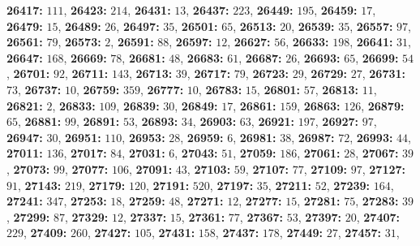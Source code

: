 \textsf{\bfseries 26417:} $111$, \textsf{\bfseries 26423:} $214$, \textsf{\bfseries 26431:} $13$, \textsf{\bfseries 26437:} $223$, \textsf{\bfseries 26449:} $195$, \textsf{\bfseries 26459:} $17$, \textsf{\bfseries 26479:} $15$, \textsf{\bfseries 26489:} $26$, \textsf{\bfseries 26497:} $35$, \textsf{\bfseries 26501:} $65$, \textsf{\bfseries 26513:} $20$, \textsf{\bfseries 26539:} $35$, \textsf{\bfseries 26557:} $97$, \textsf{\bfseries 26561:} $79$, \textsf{\bfseries 26573:} $2$, \textsf{\bfseries 26591:} $88$, \textsf{\bfseries 26597:} $12$, \textsf{\bfseries 26627:} $56$, \textsf{\bfseries 26633:} $198$, \textsf{\bfseries 26641:} $31$, \textsf{\bfseries 26647:} $168$, \textsf{\bfseries 26669:} $78$, \textsf{\bfseries 26681:} $48$, \textsf{\bfseries 26683:} $61$, \textsf{\bfseries 26687:} $26$, \textsf{\bfseries 26693:} $65$, \textsf{\bfseries 26699:} $54$, \textsf{\bfseries 26701:} $92$, \textsf{\bfseries 26711:} $143$, \textsf{\bfseries 26713:} $39$, \textsf{\bfseries 26717:} $79$, \textsf{\bfseries 26723:} $29$, \textsf{\bfseries 26729:} $27$, \textsf{\bfseries 26731:} $73$, \textsf{\bfseries 26737:} $10$, \textsf{\bfseries 26759:} $359$, \textsf{\bfseries 26777:} $10$, \textsf{\bfseries 26783:} $15$, \textsf{\bfseries 26801:} $57$, \textsf{\bfseries 26813:} $11$, \textsf{\bfseries 26821:} $2$, \textsf{\bfseries 26833:} $109$, \textsf{\bfseries 26839:} $30$, \textsf{\bfseries 26849:} $17$, \textsf{\bfseries 26861:} $159$, \textsf{\bfseries 26863:} $126$, \textsf{\bfseries 26879:} $65$, \textsf{\bfseries 26881:} $99$, \textsf{\bfseries 26891:} $53$, \textsf{\bfseries 26893:} $34$, \textsf{\bfseries 26903:} $63$, \textsf{\bfseries 26921:} $197$, \textsf{\bfseries 26927:} $97$, \textsf{\bfseries 26947:} $30$, \textsf{\bfseries 26951:} $110$, \textsf{\bfseries 26953:} $28$, \textsf{\bfseries 26959:} $6$, \textsf{\bfseries 26981:} $38$, \textsf{\bfseries 26987:} $72$, \textsf{\bfseries 26993:} $44$, \textsf{\bfseries 27011:} $136$, \textsf{\bfseries 27017:} $84$, \textsf{\bfseries 27031:} $6$, \textsf{\bfseries 27043:} $51$, \textsf{\bfseries 27059:} $186$, \textsf{\bfseries 27061:} $28$, \textsf{\bfseries 27067:} $39$, \textsf{\bfseries 27073:} $99$, \textsf{\bfseries 27077:} $106$, \textsf{\bfseries 27091:} $43$, \textsf{\bfseries 27103:} $59$, \textsf{\bfseries 27107:} $77$, \textsf{\bfseries 27109:} $97$, \textsf{\bfseries 27127:} $91$, \textsf{\bfseries 27143:} $219$, \textsf{\bfseries 27179:} $120$, \textsf{\bfseries 27191:} $520$, \textsf{\bfseries 27197:} $35$, \textsf{\bfseries 27211:} $52$, \textsf{\bfseries 27239:} $164$, \textsf{\bfseries 27241:} $347$, \textsf{\bfseries 27253:} $18$, \textsf{\bfseries 27259:} $48$, \textsf{\bfseries 27271:} $12$, \textsf{\bfseries 27277:} $15$, \textsf{\bfseries 27281:} $75$, \textsf{\bfseries 27283:} $39$, \textsf{\bfseries 27299:} $87$, \textsf{\bfseries 27329:} $12$, \textsf{\bfseries 27337:} $15$, \textsf{\bfseries 27361:} $77$, \textsf{\bfseries 27367:} $53$, \textsf{\bfseries 27397:} $20$, \textsf{\bfseries 27407:} $229$, \textsf{\bfseries 27409:} $260$, \textsf{\bfseries 27427:} $105$, \textsf{\bfseries 27431:} $158$, \textsf{\bfseries 27437:} $178$, \textsf{\bfseries 27449:} $27$, \textsf{\bfseries 27457:} $31$, 
